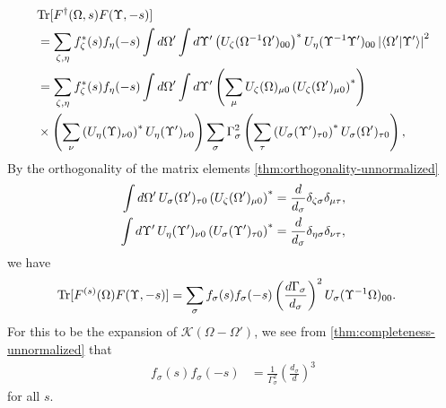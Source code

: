 \begin{align*}
	&\mathrm{Tr} [F^{\dagger}(\Omega,s)F(\Upsilon,-s)] \\
	&= \sum_{\zeta,\eta} f^*_{\zeta}(s) f_{\eta}(-s) \int d\Omega' \int d\Upsilon'
	\left( U_{\zeta}(\Omega^{-1}\Omega')_{00} \right)^* U_{\eta}(\Upsilon^{-1}\Upsilon')_{00} \left| \braket{\Omega'|\Upsilon'} \right|^2 \\
	&= \sum_{\zeta,\eta} f^*_{\zeta}(s) f_{\eta}(-s) \int d\Omega' \int d\Upsilon'
	\left( \sum_{\mu} U_{\zeta}(\Omega)_{\mu 0}  \left( U_{\zeta}(\Omega')_{\mu 0} \right)^* \right) \\
	&\times \left( \sum_{\nu} \left( U_{\eta}(\Upsilon)_{\nu 0} \right)^*  U_{\eta}(\Upsilon')_{\nu 0} \right)
	\sum_{\sigma} \Gamma_{\sigma}^2
	\left( \sum_{\tau} \left( U_{\sigma}(\Upsilon')_{\tau 0} \right)^* U_{\sigma}(\Omega')_{\tau 0} \right),
\end{align*}
By the orthogonality of the matrix elements \eqref{thm:orthogonality-unnormalized}
\begin{align}
	\int d\Omega'\,U_{\sigma}(\Omega')_{\tau 0} \left( U_{\zeta}(\Omega')_{\mu 0} \right)^* &= \frac{d}{d_{\sigma}} \delta_{\zeta \sigma} \delta_{\mu \tau}, \\
	\int d\Upsilon'\,U_{\eta}(\Upsilon')_{\nu 0} \left( U_{\sigma} (\Upsilon')_{\tau 0} \right)^* &= \frac{d}{d_{\sigma}} \delta_{\eta \sigma} \delta_{\nu \tau},
\end{align}
we have
\begin{align}
	\mathrm{Tr} [F^{(s)} (\Omega)F(\Upsilon,-s)] &= \sum_{\sigma} f_{\sigma}(s) f_{\sigma}(-s) \left( \frac{d\Gamma_{\sigma}}{d_{\sigma}} \right)^2
		U_{\sigma} (\Upsilon^{-1} \Omega)_{00}.
\end{align}
For this to be the expansion of $\mathcal{K}(\Omega - \Omega')$, we see from \eqref{thm:completeness-unnormalized} that
\begin{align}\label{suggestive-exp}
	f_{\sigma}(s) f_{\sigma}(-s) &= \frac{1}{\Gamma_{\sigma}^2} \left( \frac{d_{\sigma}}{d} \right)^3
\end{align}
for all $s$.

